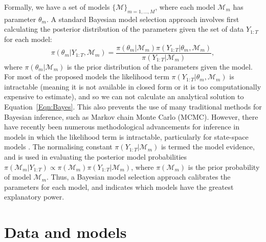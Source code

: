 \documentclass[a4paper,12pt]{article}
\begin{document}
Formally, we have a set of models $\{\mathcal{M}\}_{m=1,...,M}$, where each model $\mathcal{M}_m$ has parameter $\theta_m$.
A standard Bayesian model selection approach involves first calculating the posterior distribution of the parameters given the set of data $Y_{1:T}$ for each model:
\begin{equation} \label{Eqn:Bayes}
\pi(\theta_m \vert Y_{1:T}, \mathcal{M}_m) = \frac{\pi(\theta_m \vert \mathcal{M}_m) \pi(Y_{1:T} \vert \theta_m, \mathcal{M}_m)}{\pi(Y_{1:T} \vert \mathcal{M}_m)},
\end{equation}
\noindent where $\pi(\theta_m \vert \mathcal{M}_m)$ is the prior distribution of the parameters given the model.
For most of the proposed models the likelihood term $\pi(Y_{1:T} \vert \theta_m, \mathcal{M}_m)$ is intractable (meaning it is not available in closed form or it is too computationally expensive to estimate), and so we can not calculate an analytical solution to Equation~\ref{Eqn:Bayes}.
This also prevents the use of many traditional methods for Bayesian inference, such as Markov chain Monte Carlo (MCMC).
However, there have recently been numerous methodological advancements for inference in models in which the likelihood term is intractable, particularly for state-space models \cite{Andrieu2010,Chopin2012}.
The normalising constant $\pi(Y_{1:T} \vert \mathcal{M}_m)$ is termed the model evidence, and is used in evaluating the posterior model probabilities $\pi(\mathcal{M}_m \vert Y_{1:T}) \propto \pi(\mathcal{M}_m) \pi(Y_{1:T} \vert \mathcal{M}_m)$, where $\pi(\mathcal{M}_m)$ is the prior probability of model $\mathcal{M}_m$.
Thus, a Bayesian model selection approach calibrates the parameters for each model, and indicates which models have the greatest explanatory power.

\color{black}
\section{Data and models}
\label{Sec:Data}
\end{document}
